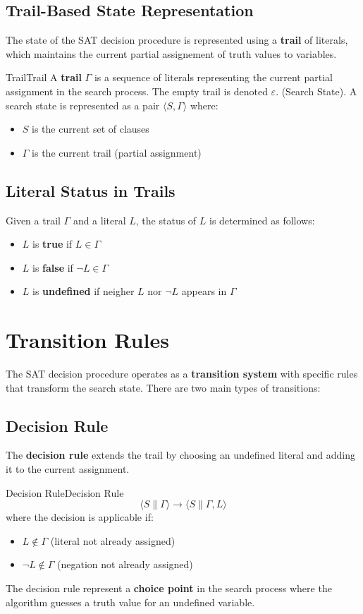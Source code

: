 \documentclass[a4paper]{article}
\theoremstyle{definition}
\begin{document}
\subsection{Trail-Based State Representation}
The state of the SAT decision procedure is represented using a \textbf{trail} of literals, which maintains 
the current partial assignement of truth values to variables.
\begin{definition}{Trail}{Trail}
A \textbf{trail} \( \varGamma \) is a sequence of literals representing the current partial assignment in the search process.
The empty trail is denoted \( \varepsilon \).
\newline
\noindent
(Search State). A search state is represented as a pair \( \langle S, \varGamma \rangle \) where:
\begin{itemize}
    \item \( S \) is the current set of clauses 
    \item \( \varGamma \) is the current trail (partial assignment)
\end{itemize}
\end{definition}
\subsection{Literal Status in Trails}
Given a trail \( \varGamma \) and a literal \( L \), the status of \( L \) is determined as follows:
\begin{itemize}
    \item \( L \) is \textbf{true} if \( L \in \varGamma \)     
    \item \( L \) is \textbf{false} if \( \lnot L \in \varGamma \) 
    \item \( L \) is \textbf{undefined} if neigher \( L \) nor \( \lnot L \) appears in \( \varGamma \) 
\end{itemize}
\section{Transition Rules}
The SAT decision procedure operates as a \textbf{transition system} with specific rules that transform the search state. There 
are two main types of transitions:
\subsection{Decision Rule}
The \textbf{decision rule} extends the trail by choosing an undefined literal and adding it to the current assignment.
\begin{definition}{Decision Rule}{Decision Rule}
\[
  \langle S \parallel \varGamma \rangle \rightarrow \langle S \parallel \varGamma, L \rangle
\]
where the decision is applicable if:
\begin{itemize}
    \item \( L \notin \varGamma \) (literal not already assigned)
    \item \( \lnot L \notin \varGamma \) (negation not already assigned)
\end{itemize}
\end{definition}
The decision rule represent a \textbf{choice point} in the search process where the algorithm guesses a truth value for an undefined variable.
\end{document}
